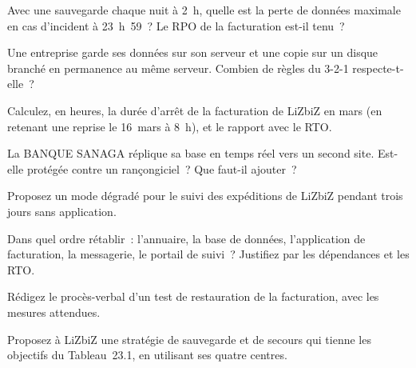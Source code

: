 \begin{boxexo}[title={\ding{45}\quad Exercice~23.2. La fréquence \niveaubase}]
Avec une sauvegarde chaque nuit à 2~h, quelle est la perte de données
maximale en cas d'incident à 23~h~59~? Le RPO de la facturation est-il
tenu~?
\end{boxexo}

\begin{boxexo}[title={\ding{45}\quad Exercice~23.3. 3-2-1 \niveaubase}]
Une entreprise garde ses données sur son serveur et une copie sur un
disque branché en permanence au même serveur. Combien de règles du 3-2-1
respecte-t-elle~?
\end{boxexo}

\begin{boxexo}[title={\ding{45}\quad Exercice~23.4. Les écarts \niveaumoyen}]
Calculez, en heures, la durée d'arrêt de la facturation de LiZbiZ en mars
(en retenant une reprise le 16~mars à 8~h), et le rapport avec le RTO.
\end{boxexo}

\begin{boxexo}[title={\ding{45}\quad Exercice~23.5. Réplication \niveaumoyen}]
La BANQUE SANAGA réplique sa base en temps réel vers un second site.
Est-elle protégée contre un rançongiciel~? Que faut-il ajouter~?
\end{boxexo}

\begin{boxexo}[title={\ding{45}\quad Exercice~23.6. Mode dégradé \niveaumoyen}]
Proposez un mode dégradé pour le suivi des expéditions de LiZbiZ pendant
trois jours sans application.
\end{boxexo}

\begin{boxexo}[title={\ding{45}\quad Exercice~23.7. L'ordre de reprise \niveaumoyen}]
Dans quel ordre rétablir~: l'annuaire, la base de données, l'application
de facturation, la messagerie, le portail de suivi~? Justifiez par les
dépendances et les RTO.
\end{boxexo}

\begin{boxexo}[title={\ding{45}\quad Exercice~23.8. Le procès-verbal \niveaumoyen}]
Rédigez le procès-verbal d'un test de restauration de la facturation,
avec les mesures attendues.
\end{boxexo}

\begin{boxexo}[title={\ding{45}\quad Exercice~23.9. Stratégie \niveauexpert}]
Proposez à LiZbiZ une stratégie de sauvegarde et de secours qui tienne
les objectifs du Tableau~23.1, en utilisant ses quatre centres.
\end{boxexo}

